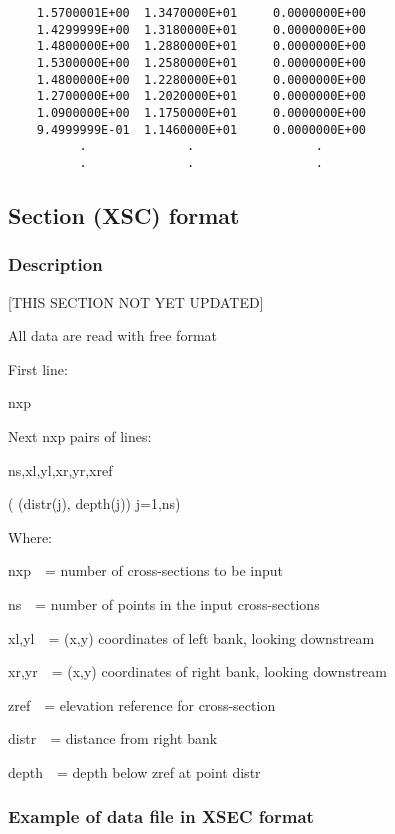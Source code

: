 \documentclass{article}
\begin{document}
\begin{small}
\begin{lstlisting}
    1.5700001E+00  1.3470000E+01     0.0000000E+00   
    1.4299999E+00  1.3180000E+01     0.0000000E+00   
    1.4800000E+00  1.2880000E+01     0.0000000E+00   
    1.5300000E+00  1.2580000E+01     0.0000000E+00   
    1.4800000E+00  1.2280000E+01     0.0000000E+00   
    1.2700000E+00  1.2020000E+01     0.0000000E+00   
    1.0900000E+00  1.1750000E+01     0.0000000E+00   
    9.4999999E-01  1.1460000E+01     0.0000000E+00   
          .              .                 .     
          .              .                 .    
\end{lstlisting}
\end{small}

\newpage
\subsection[Section (XSC) format]{Section (XSC) format}
\subsubsection[Description]{Description}
[THIS SECTION NOT YET UPDATED]
\bigskip

All data are read with free format

First line:

nxp

Next nxp pairs of lines:

ns,xl,yl,xr,yr,xref

( (distr(j), depth(j)) j=1,ns)


\bigskip


\bigskip

Where:

nxp\ \ = number of cross-sections to be input

ns\ \ = number of points in the input cross-sections

xl,yl\ \ = (x,y) coordinates of left bank, looking downstream

xr,yr\ \ = (x,y) coordinates of right bank, looking downstream

zref\ \ = elevation reference for cross-section

distr\ \ = distance from right bank

depth\ \ = depth below zref at point distr


\bigskip

\subsubsection[Example of data file in XSEC format]{Example of data file in XSEC format}
\end{document}

